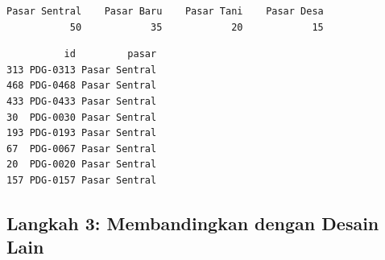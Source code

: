 \documentclass[
  indonesian,
  letterpaper,
]{book}
\newenvironment{Shaded}{\begin{snugshade}}{\end{snugshade}}
\newcommand{\CommentTok}[1]{\textcolor[rgb]{0.37,0.37,0.37}{#1}}
\newcommand{\ControlFlowTok}[1]{\textcolor[rgb]{0.00,0.23,0.31}{\textbf{#1}}}
\newcommand{\DecValTok}[1]{\textcolor[rgb]{0.68,0.00,0.00}{#1}}
\newcommand{\FunctionTok}[1]{\textcolor[rgb]{0.28,0.35,0.67}{#1}}
\newcommand{\NormalTok}[1]{\textcolor[rgb]{0.00,0.23,0.31}{#1}}
\newcommand{\OtherTok}[1]{\textcolor[rgb]{0.00,0.23,0.31}{#1}}
\newcommand{\SpecialCharTok}[1]{\textcolor[rgb]{0.37,0.37,0.37}{#1}}
\newcommand{\StringTok}[1]{\textcolor[rgb]{0.13,0.47,0.30}{#1}}
\begin{document}
\begin{verbatim}
Pasar Sentral    Pasar Baru    Pasar Tani    Pasar Desa 
           50            35            20            15 
\end{verbatim}

\begin{Shaded}
\end{Shaded}

\begin{verbatim}
          id         pasar
313 PDG-0313 Pasar Sentral
468 PDG-0468 Pasar Sentral
433 PDG-0433 Pasar Sentral
30  PDG-0030 Pasar Sentral
193 PDG-0193 Pasar Sentral
67  PDG-0067 Pasar Sentral
20  PDG-0020 Pasar Sentral
157 PDG-0157 Pasar Sentral
\end{verbatim}

\begin{Shaded}
\end{Shaded}

\subsection{Langkah 3: Membandingkan dengan Desain
Lain}\label{langkah-3-membandingkan-dengan-desain-lain}
\end{document}
